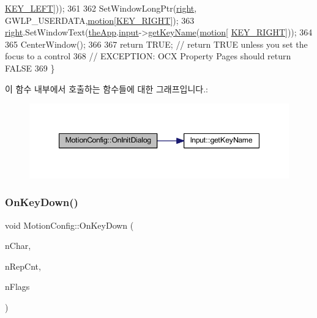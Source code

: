 \begin{DoxyCode}
      \mbox{\hyperlink{_s_d_l_8cpp_abc5c98fcc1211af2b80116dd6e0a035da612120b69c7dfd46086db7aaebdbcf65}{KEY\_LEFT}}]));
361 
362   SetWindowLongPtr(\mbox{\hyperlink{class_motion_config_ae9203bef30efdd067ea44d1f7cded8dc}{right}}, GWLP\_USERDATA,\mbox{\hyperlink{_joypad_8cpp_af6761499604a971a202b9ea0dc6ef5a9}{motion}}[\mbox{\hyperlink{_s_d_l_8cpp_abc5c98fcc1211af2b80116dd6e0a035da6504370d9c6391e1a9da6a1a529b089d}{KEY\_RIGHT}}]);
363   \mbox{\hyperlink{class_motion_config_ae9203bef30efdd067ea44d1f7cded8dc}{right}}.SetWindowText(\mbox{\hyperlink{_v_b_a_8cpp_a8095a9d06b37a7efe3723f3218ad8fb3}{theApp}}.\mbox{\hyperlink{class_v_b_a_aaab971cb5d67a69e1a26502d15a4dc60}{input}}->\mbox{\hyperlink{class_input_a2c4ec8a744b040657e220480987cd8bf}{getKeyName}}(\mbox{\hyperlink{_joypad_8cpp_af6761499604a971a202b9ea0dc6ef5a9}{motion}}[
      \mbox{\hyperlink{_s_d_l_8cpp_abc5c98fcc1211af2b80116dd6e0a035da6504370d9c6391e1a9da6a1a529b089d}{KEY\_RIGHT}}]));
364 
365   CenterWindow();
366 
367   \textcolor{keywordflow}{return} TRUE;  \textcolor{comment}{// return TRUE unless you set the focus to a control}
368                 \textcolor{comment}{// EXCEPTION: OCX Property Pages should return FALSE}
369 \}
\end{DoxyCode}
이 함수 내부에서 호출하는 함수들에 대한 그래프입니다.\+:
\nopagebreak
\begin{figure}[H]
\begin{center}
\leavevmode
\includegraphics[width=347pt]{class_motion_config_ac1e282a94d14b433764eeae95b4cab6b_cgraph}
\end{center}
\end{figure}
\mbox{\label{class_motion_config_a210354b3272911c9ed7507c7262243f1}} 
\subsubsection{\texorpdfstring{On\+Key\+Down()}{OnKeyDown()}}
{\footnotesize\ttfamily void Motion\+Config\+::\+On\+Key\+Down (\begin{DoxyParamCaption}\item[{U\+I\+NT}]{n\+Char,  }\item[{U\+I\+NT}]{n\+Rep\+Cnt,  }\item[{U\+I\+NT}]{n\+Flags }\end{DoxyParamCaption})\hspace{0.3cm}{\ttfamily [protected]}}



